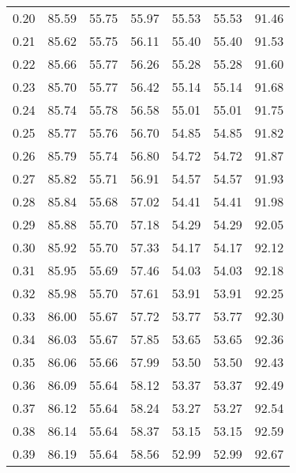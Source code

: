 \begin{tabular}{|c|c|c|c|c|c|c|}
      0.20 &     85.59 &     55.75 &      55.97 &   55.53 &      55.53 &         91.46 \\
      0.21 &     85.62 &     55.75 &      56.11 &   55.40 &      55.40 &         91.53 \\
      0.22 &     85.66 &     55.77 &      56.26 &   55.28 &      55.28 &         91.60 \\
      0.23 &     85.70 &     55.77 &      56.42 &   55.14 &      55.14 &         91.68 \\
      0.24 &     85.74 &     55.78 &      56.58 &   55.01 &      55.01 &         91.75 \\
      0.25 &     85.77 &     55.76 &      56.70 &   54.85 &      54.85 &         91.82 \\
      0.26 &     85.79 &     55.74 &      56.80 &   54.72 &      54.72 &         91.87 \\
      0.27 &     85.82 &     55.71 &      56.91 &   54.57 &      54.57 &         91.93 \\
      0.28 &     85.84 &     55.68 &      57.02 &   54.41 &      54.41 &         91.98 \\
      0.29 &     85.88 &     55.70 &      57.18 &   54.29 &      54.29 &         92.05 \\
      0.30 &     85.92 &     55.70 &      57.33 &   54.17 &      54.17 &         92.12 \\
      0.31 &     85.95 &     55.69 &      57.46 &   54.03 &      54.03 &         92.18 \\
      0.32 &     85.98 &     55.70 &      57.61 &   53.91 &      53.91 &         92.25 \\
      0.33 &     86.00 &     55.67 &      57.72 &   53.77 &      53.77 &         92.30 \\
      0.34 &     86.03 &     55.67 &      57.85 &   53.65 &      53.65 &         92.36 \\
      0.35 &     86.06 &     55.66 &      57.99 &   53.50 &      53.50 &         92.43 \\
      0.36 &     86.09 &     55.64 &      58.12 &   53.37 &      53.37 &         92.49 \\
      0.37 &     86.12 &     55.64 &      58.24 &   53.27 &      53.27 &         92.54 \\
      0.38 &     86.14 &     55.64 &      58.37 &   53.15 &      53.15 &         92.59 \\
      0.39 &     86.19 &     55.64 &      58.56 &   52.99 &      52.99 &         92.67 \\

\end{tabular}
